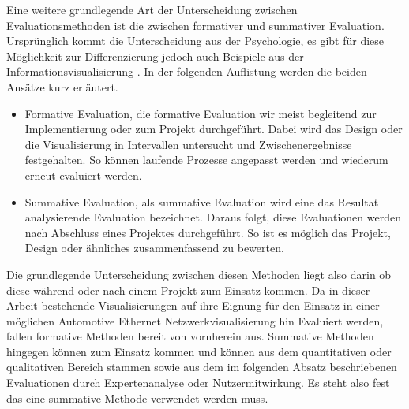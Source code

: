 \documentclass[draft=false
              ,paper=a4
              ,twoside=false
              ,fontsize=11pt
              ,headsepline
              ,BCOR10mm
              ,DIV11
              ]{scrbook}
\begin{document}
Eine weitere grundlegende Art der Unterscheidung zwischen Evaluationsmethoden ist die zwischen formativer und summativer Evaluation. Ursprünglich kommt die Unterscheidung aus der Psychologie, es gibt für diese Möglichkeit zur Differenzierung jedoch auch Beispiele aus der Informationsvisualisierung \cite{andrews_evaluating_2006}. In der folgenden Auflistung werden die beiden Ansätze kurz erläutert.
\begin{itemize}
  \item Formative Evaluation, die formative Evaluation wir meist begleitend zur Implementierung oder zum Projekt durchgeführt. Dabei wird das Design oder die Visualisierung in Intervallen untersucht und Zwischenergebnisse festgehalten. So können laufende Prozesse angepasst werden und wiederum erneut evaluiert werden.
  \item Summative Evaluation, als summative Evaluation wird eine das Resultat analysierende Evaluation bezeichnet. Daraus folgt, diese Evaluationen werden nach Abschluss eines Projektes durchgeführt. So ist es möglich das Projekt, Design oder ähnliches zusammenfassend zu bewerten.
\end{itemize}
Die grundlegende Unterscheidung zwischen diesen Methoden liegt also darin ob diese während oder nach einem Projekt zum Einsatz kommen.  Da in dieser Arbeit bestehende Visualisierungen auf ihre Eignung für den Einsatz in einer möglichen Automotive Ethernet Netzwerkvisualisierung hin Evaluiert werden, fallen formative Methoden bereit von vornherein aus. Summative Methoden hingegen können zum Einsatz kommen und können aus dem quantitativen oder qualitativen Bereich stammen sowie aus dem im folgenden Absatz beschriebenen Evaluationen durch Expertenanalyse oder Nutzermitwirkung. Es steht also fest das eine summative Methode verwendet werden muss.
\end{document}
